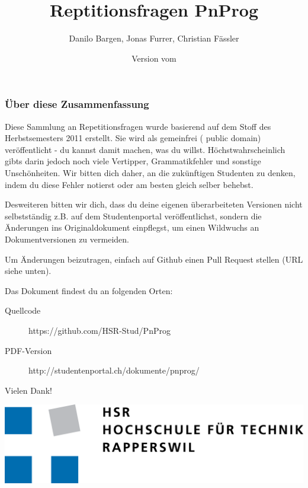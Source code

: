 \documentclass[10pt,a4paper]{scrartcl}
\author{Danilo Bargen, Jonas Furrer, Christian Fässler}
\title{Reptitionsfragen PnProg}
\date{Version vom \revisiondate}
\begin{document}
\begin{titlepage}
	\maketitle
	\begin{center}\Huge\ccPublicDomain\end{center}

	\vspace{65mm}

	\subsubsection*{Über diese Zusammenfassung}

	Diese Sammlung an Repetitionsfragen wurde basierend auf dem Stoff des Herbstsemesters 2011 erstellt.
	Sie wird als gemeinfrei ({\ccPublicDomain} public domain) veröffentlicht - du kannst damit machen,
	was du willst. Höchstwahrscheinlich gibts darin jedoch noch viele Vertipper, Grammatikfehler und
	sonstige Unschönheiten. Wir bitten dich daher, an die zukünftigen Studenten zu denken, indem du
	diese Fehler notierst oder am besten gleich selber behebst.

	Desweiteren bitten wir dich, dass du deine eigenen überarbeiteten Versionen nicht selbstständig
	z.B.  auf dem Studentenportal veröffentlichst, sondern die Änderungen ins Originaldokument
	einpflegst, um einen Wildwuchs an Dokumentversionen zu vermeiden.

	Um Änderungen beizutragen, einfach auf Github einen Pull Request stellen (URL siehe unten).

	Das Dokument findest du an folgenden Orten:

	\begin{description}
		\item[Quellcode] https://github.com/HSR-Stud/PnProg
		\item[PDF-Version] http://studentenportal.ch/dokumente/pnprog/
	\end{description}

	Vielen Dank!

	\vspace{10mm}

	\includegraphics{hsr_logo.png}
	\thispagestyle{empty} %
\end{titlepage}
\end{document}
